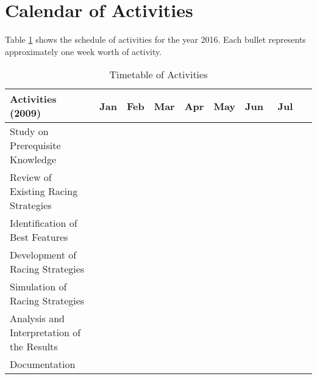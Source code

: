 \section{Calendar of Activities}

Table \ref{tab:timetableactivities} shows the schedule of activities for the year 2016.  
Each bullet represents approximately one week worth of activity.

%
%
\newcommand{\weekone}{\textbullet}
\newcommand{\weektwo}{\textbullet \textbullet}
\newcommand{\weekthree}{\textbullet \textbullet \textbullet}
\newcommand{\weekfour}{\textbullet \textbullet \textbullet \textbullet}

%
%
\begin{comment}
   \newcommand{\weekone}{$\star$}
   \newcommand{\weektwo}{$\star \star$}
   \newcommand{\weekthree}{$\star \star \star$}
   \newcommand{\weekfour}{$\star \star \star \star$ }
\end{comment}



\begin{table}[ht]   %
\centering
\caption{Timetable of Activities} \vspace{0.25em}
\begin{tabular}{|p{2in}|c|c|c|c|c|c|c|c|} \hline
\centering Activities (2009) & Jan   & Feb & Mar & Apr & May & Jun & Jul \\ \hline
Study on Prerequisite Knowledge      &   &  & ~~~\weektwo & \weekfour &  &  &  \\ \hline
Review of Existing Racing Strategies & ~~~\weektwo  & \weekfour & \weekfour & \weekfour &  &  &  \\ \hline
Identification of Best Features      &   &  &  & \weekfour & \weektwo~~~ &  &  \\ \hline
Development of Racing Strategies     &   &  &  & ~~~\weektwo & \weekfour & \weektwo~~~ &  \\ \hline
Simulation of Racing Strategies      &   &  &  & ~~~\weektwo & \weekfour & \weekthree~~ &  \\ \hline
Analysis and Interpretation of the Results &   &  &  &  & \weekfour & \weekfour & \weekone~~~~~ \\ \hline
Documentation & ~~~\weektwo  & \weekfour & \weekfour & \weekfour & \weekfour & \weekfour & \weektwo~~~ \\ \hline
\end{tabular}
\label{tab:timetableactivities}
\end{table}

